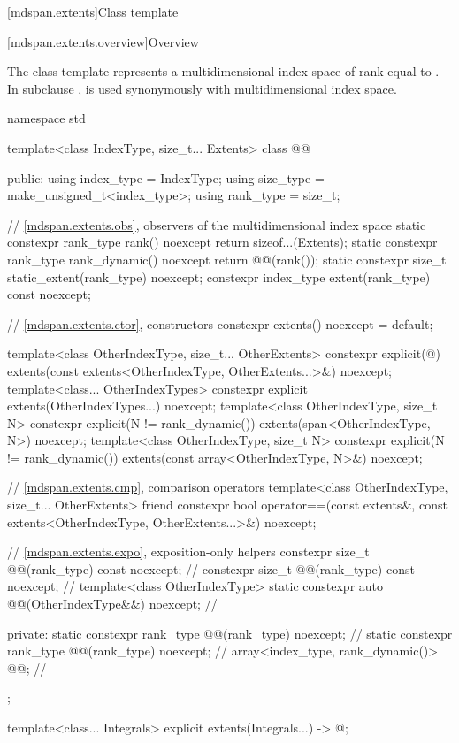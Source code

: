 [mdspan.extents]{Class template }

[mdspan.extents.overview]{Overview}

The class template  represents
a multidimensional index space of rank equal to .
In subclause ,
 is used synonymously with multidimensional index space.

\begin{codeblock}
namespace std {
  template<class IndexType, size_t... Extents>
  class @@ {
  public:
    using index_type = IndexType;
    using size_type = make_unsigned_t<index_type>;
    using rank_type = size_t;

    // \ref{mdspan.extents.obs}, observers of the multidimensional index space
    static constexpr rank_type rank() noexcept { return sizeof...(Extents); }
    static constexpr rank_type rank_dynamic() noexcept { return @@(rank()); }
    static constexpr size_t static_extent(rank_type) noexcept;
    constexpr index_type extent(rank_type) const noexcept;

    // \ref{mdspan.extents.ctor}, constructors
    constexpr extents() noexcept = default;

    template<class OtherIndexType, size_t... OtherExtents>
      constexpr explicit(@\seebelow@)
        extents(const extents<OtherIndexType, OtherExtents...>&) noexcept;
    template<class... OtherIndexTypes>
      constexpr explicit extents(OtherIndexTypes...) noexcept;
    template<class OtherIndexType, size_t N>
      constexpr explicit(N != rank_dynamic())
        extents(span<OtherIndexType, N>) noexcept;
    template<class OtherIndexType, size_t N>
      constexpr explicit(N != rank_dynamic())
        extents(const array<OtherIndexType, N>&) noexcept;

    // \ref{mdspan.extents.cmp}, comparison operators
    template<class OtherIndexType, size_t... OtherExtents>
      friend constexpr bool operator==(const extents&,
                                       const extents<OtherIndexType, OtherExtents...>&) noexcept;

    // \ref{mdspan.extents.expo}, exposition-only helpers
    constexpr size_t @@(rank_type) const noexcept;     // \expos
    constexpr size_t @@(rank_type) const noexcept;     // \expos
    template<class OtherIndexType>
      static constexpr auto @@(OtherIndexType&&) noexcept;      // \expos

  private:
    static constexpr rank_type @@(rank_type) noexcept;       // \expos
    static constexpr rank_type @@(rank_type) noexcept;   // \expos
    array<index_type, rank_dynamic()> @@{};                // \expos
  };

  template<class... Integrals>
    explicit extents(Integrals...)
      -> @\seebelow@;
}
\end{codeblock}

